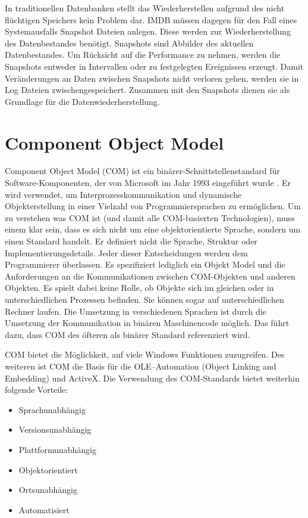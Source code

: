 In traditionellen Datenbanken stellt das Wiederherstellen aufgrund des nicht flüchtigen Speichers kein Problem dar. IMDB müssen dagegen für den Fall eines Systemausfalls Snapshot Dateien anlegen. Diese werden zur Wiederherstellung des Datenbestandes benötigt. Snapshots sind Abbilder des aktuellen Datenbestandes. Um Rücksicht auf die Performance zu nehmen, werden die Snapshots entweder in Intervallen oder zu festgelegten Ereignissen erzeugt. Damit Veränderungen an Daten zwischen Snapshots nicht verloren gehen, werden sie in Log Dateien zwischengespeichert. Zusammen mit den Snapshots dienen sie als Grundlage für die Datenwiederherstellung. 

\section{Component Object Model}
\label{ch:grundlagen:sec:ComponentObjectModel}

Component Object Model (COM) ist ein binärer-Schnittstellenstandard für Software-Komponenten, der von Microsoft im Jahr 1993 eingeführt wurde \cite{SWB-088582566}. Er wird verwendet, um Interprozesskommunikation und dynamische Objekterstellung in einer Vielzahl von Programmiersprachen zu ermöglichen. Um zu verstehen was COM ist (und damit alle COM-basierten Technologien), muss einem klar sein, dass es sich nicht um eine objektorientierte Sprache, sondern um einen Standard handelt. Er definiert nicht die Sprache, Struktur oder Implementierungsdetails. Jeder dieser Entscheidungen werden dem Programmierer überlassen. Es spezifiziert lediglich ein Objekt Model und die Anforderungen an die Kommunikationen zwischen COM-Objekten und anderen Objekten. Es spielt dabei keine Rolle, ob Objekte sich im gleichen oder in unterschiedlichen Prozessen befinden. Sie können sogar auf unterschiedlichen Rechner laufen. Die Umsetzung in verschiedenen Sprachen ist durch die Umsetzung der Kommunikation in binären Maschinencode möglich. Das führt dazu, dass COM des öfteren als binärer Standard referenziert wird.

COM bietet die Möglichkeit, auf viele Windows Funktionen zuzugreifen. Des weiteren ist COM die Basis für die OLE–Automation (Object Linking and Embedding) und ActiveX. Die Verwendung des COM-Standards bietet weiterhin folgende Vorteile:

\begin{itemize}
\item Sprachunabhängig
\item Versionsunabhängig
\item Plattformunabhängig
\item Objektorientiert
\item Ortsunabhängig
\item Automatisiert
\end{itemize} 

